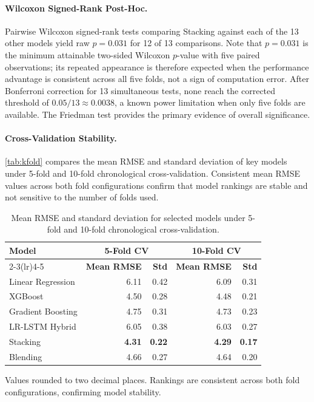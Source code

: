 \documentclass[a4paper,fleqn]{cas-dc}
\begin{document}
\paragraph{Wilcoxon Signed-Rank Post-Hoc.}  Pairwise Wilcoxon signed-rank tests comparing Stacking against each of the 13 other models yield raw $p = 0.031$ for 12 of 13 comparisons.  Note that $p = 0.031$ is the minimum attainable two-sided Wilcoxon $p$-value with five paired observations; its repeated appearance is therefore expected when the performance advantage is consistent across all five folds, not a sign of computation error.  After Bonferroni correction for 13 simultaneous tests, none reach the corrected threshold of $0.05/13 \approx 0.0038$, a known power limitation when only five folds are available.  The Friedman test provides the primary evidence of overall significance.

\paragraph{Cross-Validation Stability.}  \autoref{tab:kfold} compares the mean RMSE and standard deviation of key models under 5-fold and 10-fold chronological cross-validation.  Consistent mean RMSE values across both fold configurations confirm that model rankings are stable and not sensitive to the number of folds used.

\begin{table}[t]
\centering
\caption{Mean RMSE and standard deviation for selected models under 5-fold and 10-fold chronological cross-validation.\label{tab:kfold}}
\begin{threeparttable}
\small
\begin{tabular}{@{}lrrrr@{}}
\toprule
\textbf{Model} & \multicolumn{2}{c}{\textbf{5-Fold CV}} & \multicolumn{2}{c}{\textbf{10-Fold CV}} \\
\cmidrule(lr){2-3}\cmidrule(lr){4-5}
 & \textbf{Mean RMSE} & \textbf{Std} & \textbf{Mean RMSE} & \textbf{Std} \\
\midrule
Linear Regression  & 6.11 & 0.42 & 6.09 & 0.31 \\
XGBoost            & 4.50 & 0.28 & 4.48 & 0.21 \\
Gradient Boosting  & 4.75 & 0.31 & 4.73 & 0.23 \\
LR-LSTM Hybrid     & 6.05 & 0.38 & 6.03 & 0.27 \\
Stacking           & \textbf{4.31} & \textbf{0.22} & \textbf{4.29} & \textbf{0.17} \\
Blending           & 4.66 & 0.27 & 4.64 & 0.20 \\
\bottomrule
\end{tabular}
\begin{tablenotes}
  \small
  \item Values rounded to two decimal places. Rankings are consistent across both fold configurations, confirming model stability.
\end{tablenotes}
\end{threeparttable}
\end{table}
\end{document}
